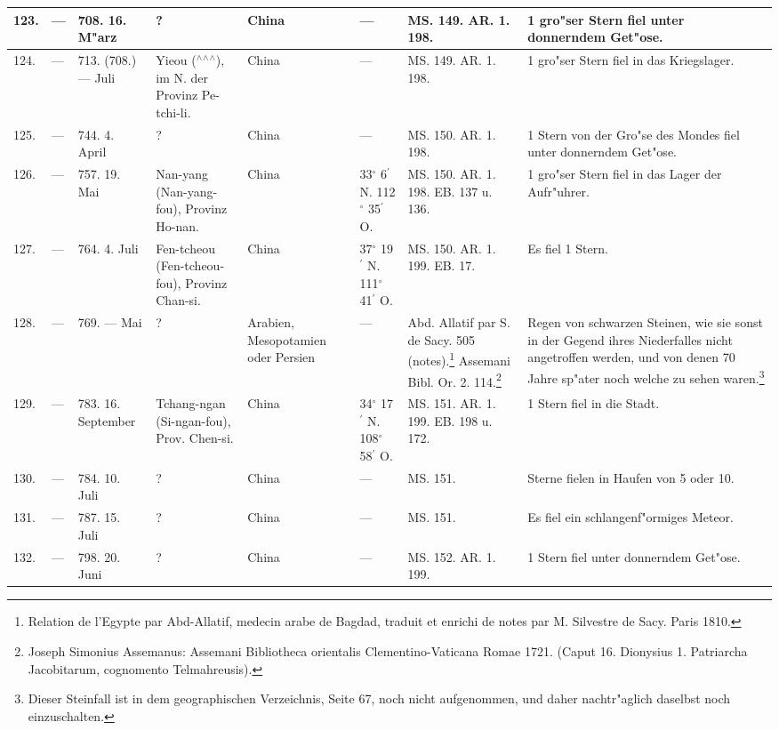 \documentclass[a4paper, 8pt, oneside, polutonikogreek, german]{article}
\begin{document}
\begin{center}
\begin{longtable}{| p{5mm} | p{3mm} | p{15mm} | p{25mm} | p{20mm} | p{14mm} | p{17mm} | p{24mm} |}
        123. & --- & 708. 16. M"arz & ? & China & --- & MS. 149. AR. 1. 198. & 1 gro"ser Stern fiel unter donnerndem Get"ose. \\ \hline
        124. & --- & 713. (708.) --- Juli & Yieou ($^\wedge$$^\wedge$$^\wedge$), im N. der Provinz Pe-tchi-li. & China & --- & MS. 149. AR. 1. 198. & 1 gro"ser Stern fiel in das Kriegslager. \\ \hline
        125. & --- & 744. 4. April & ? & China & --- & MS. 150. AR. 1. 198. & 1 Stern von der Gro"se des Mondes fiel unter donnerndem Get"ose. \\ \hline
        126. & --- & 757. 19. Mai & Nan-yang (Nan-yang-fou), Provinz Ho-nan. & China & 33$^\circ$ 6$^\prime$ N. 112$^\circ$ 35$^\prime$ O. & MS. 150. AR. 1. 198. EB. 137 u. 136. & 1 gro"ser Stern fiel in das Lager der Aufr"uhrer. \\ \hline
        127. & --- & 764. 4. Juli & Fen-tcheou (Fen-tcheou-fou), Provinz Chan-si. & China & 37$^\circ$ 19$^\prime$ N. 111$^\circ$ 41$^\prime$ O. & MS. 150. AR. 1. 199. EB. 17. & Es fiel 1 Stern. \\ \hline
        128. & --- & 769. --- Mai & ? & Arabien, Mesopotamien oder Persien & --- & Abd. Allatif par S. de Sacy. 505 (notes).\footnote{Relation de l'Egypte par Abd-Allatif, medecin arabe de Bagdad, traduit et enrichi de notes par M. Silvestre de Sacy. Paris 1810.} Assemani Bibl. Or. 2. 114.\footnote{Joseph Simonius Assemanus: Assemani Bibliotheca orientalis Clementino-Vaticana Romae 1721. (Caput 16. Dionysius 1. Patriarcha Jacobitarum, cognomento Telmahreusis).} & Regen von schwarzen Steinen, wie sie sonst in der Gegend ihres Niederfalles nicht angetroffen werden, und von denen 70 Jahre sp"ater noch welche zu sehen waren.\footnote{Dieser Steinfall ist in dem geographischen Verzeichnis, Seite 67, noch nicht aufgenommen, und daher nachtr"aglich daselbst noch einzuschalten.} \\ \hline
        129. & --- & 783. 16. September & Tchang-ngan (Si-ngan-fou), Prov. Chen-si. & China & 34$^\circ$ 17$^\prime$ N. 108$^\circ$ 58$^\prime$ O. & MS. 151. AR. 1. 199. EB. 198 u. 172. & 1 Stern fiel in die Stadt. \\ \hline
        130. & --- & 784. 10. Juli & ? & China & --- & MS. 151. & Sterne fielen in Haufen von 5 oder 10. \\ \hline
        131. & --- & 787. 15. Juli & ? & China & --- & MS. 151. & Es fiel ein schlangenf"ormiges Meteor. \\ \hline
        132. & --- & 798. 20. Juni & ? & China & --- & MS. 152. AR. 1. 199. & 1 Stern fiel unter donnerndem Get"ose. \\ \hline

\end{longtable}
\end{center}
\end{document}
